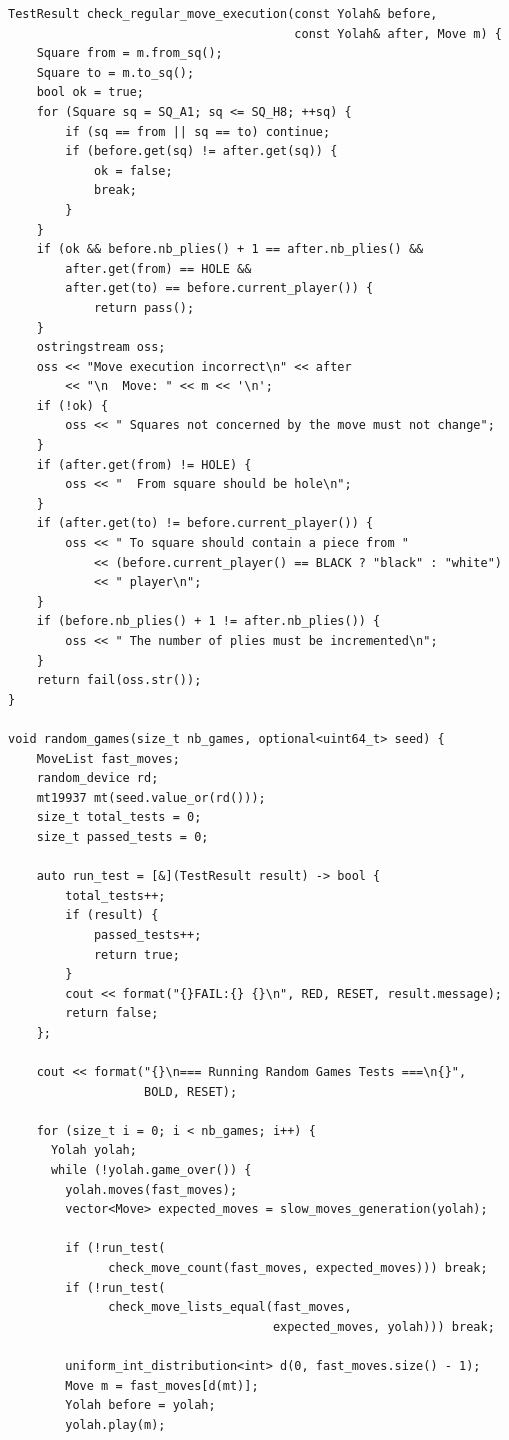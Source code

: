 \documentclass[12pt,a4paper,twoside,openright]{book}
\begin{document}
\begin{mdframed}[skipabove=\baselineskip,topline=false,rightline=false,bottomline=false,leftline=false,linewidth=1pt,linecolor=gray!40,innerleftmargin=8pt]
\begin{verbatim}
TestResult check_regular_move_execution(const Yolah& before, 
                                        const Yolah& after, Move m) {
    Square from = m.from_sq();
    Square to = m.to_sq();
    bool ok = true;
    for (Square sq = SQ_A1; sq <= SQ_H8; ++sq) {
        if (sq == from || sq == to) continue;
        if (before.get(sq) != after.get(sq)) {
            ok = false;
            break;
        }
    }
    if (ok && before.nb_plies() + 1 == after.nb_plies() && 
        after.get(from) == HOLE && 
        after.get(to) == before.current_player()) {
            return pass();
    }
    ostringstream oss;
    oss << "Move execution incorrect\n" << after 
        << "\n  Move: " << m << '\n';
    if (!ok) {
        oss << " Squares not concerned by the move must not change";
    }
    if (after.get(from) != HOLE) {
        oss << "  From square should be hole\n";
    }
    if (after.get(to) != before.current_player()) {
        oss << " To square should contain a piece from " 
            << (before.current_player() == BLACK ? "black" : "white") 
            << " player\n";
    }
    if (before.nb_plies() + 1 != after.nb_plies()) {
        oss << " The number of plies must be incremented\n";
    }
    return fail(oss.str());
}

void random_games(size_t nb_games, optional<uint64_t> seed) {
    MoveList fast_moves;
    random_device rd;
    mt19937 mt(seed.value_or(rd()));
    size_t total_tests = 0;
    size_t passed_tests = 0;

    auto run_test = [&](TestResult result) -> bool {
        total_tests++;
        if (result) {
            passed_tests++;
            return true;
        }
        cout << format("{}FAIL:{} {}\n", RED, RESET, result.message);
        return false;
    };
    
    cout << format("{}\n=== Running Random Games Tests ===\n{}", 
                   BOLD, RESET);

    for (size_t i = 0; i < nb_games; i++) {
      Yolah yolah;
      while (!yolah.game_over()) {
        yolah.moves(fast_moves);
        vector<Move> expected_moves = slow_moves_generation(yolah);

        if (!run_test(
              check_move_count(fast_moves, expected_moves))) break;
        if (!run_test(
              check_move_lists_equal(fast_moves, 
                                     expected_moves, yolah))) break;

        uniform_int_distribution<int> d(0, fast_moves.size() - 1);
        Move m = fast_moves[d(mt)];
        Yolah before = yolah;
        yolah.play(m);


\end{verbatim}
\end{mdframed}
\end{document}
